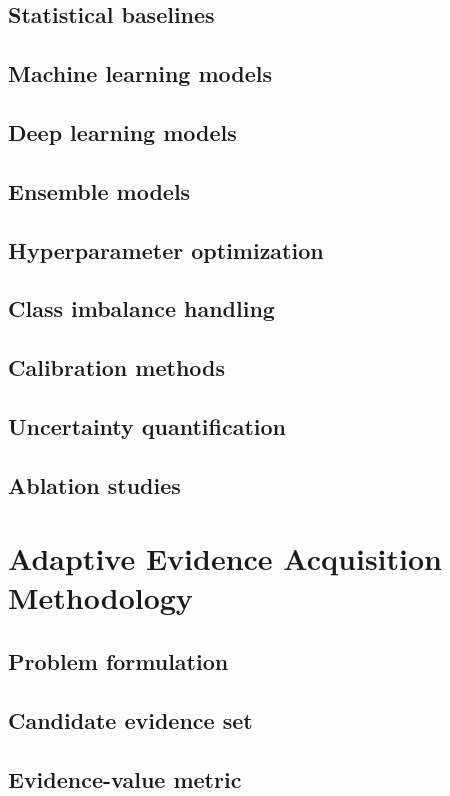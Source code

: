 \documentclass[10pt,journal]{IEEEtran}
\begin{document}
\subsection{Statistical baselines}
\subsection{Machine learning models}
\subsection{Deep learning models}
\subsection{Ensemble models}
\subsection{Hyperparameter optimization}
\subsection{Class imbalance handling}
\subsection{Calibration methods}
\subsection{Uncertainty quantification}
\subsection{Ablation studies}

\section{Adaptive Evidence Acquisition Methodology}
\subsection{Problem formulation}
\subsection{Candidate evidence set}
\subsection{Evidence-value metric}
\end{document}
